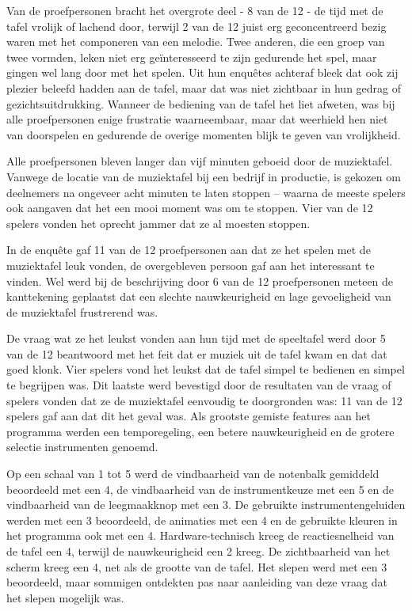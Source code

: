 \documentclass{acm}
\begin{document}
Van de proefpersonen bracht het overgrote deel - 8 van de 12 - de tijd met de tafel vrolijk of lachend door, terwijl 2 van de 12 juist erg geconcentreerd bezig waren met het componeren van een melodie. Twee anderen, die een groep van twee vormden, leken niet erg ge\"interesseerd te zijn gedurende het spel, maar gingen wel lang door met het spelen. Uit hun enquêtes achteraf bleek dat ook zij plezier beleefd hadden aan de tafel, maar dat was niet zichtbaar in hun gedrag of gezichtsuitdrukking. Wanneer de bediening van de tafel het liet afweten, was bij alle proefpersonen enige frustratie waarneembaar, maar dat weerhield hen niet van doorspelen en gedurende de overige momenten blijk te geven van vrolijkheid. 

Alle proefpersonen bleven langer dan vijf minuten geboeid door de muziektafel. Vanwege de locatie van de muziektafel bij een bedrijf in productie, is gekozen om deelnemers na ongeveer acht minuten te laten stoppen -- waarna de meeste spelers ook aangaven dat het een mooi moment was om te stoppen. Vier van de 12 spelers vonden het oprecht jammer dat ze al moesten stoppen.

In de enquête gaf 11 van de 12 proefpersonen aan dat ze het spelen met de muziektafel leuk vonden, de overgebleven persoon gaf aan het interessant te vinden. Wel werd bij de beschrijving door 6 van de 12 proefpersonen meteen de kanttekening geplaatst dat een slechte nauwkeurigheid en lage gevoeligheid van de muziektafel frustrerend was.

De vraag wat ze het leukst vonden aan hun tijd met de speeltafel werd door 5 van de 12 beantwoord met het feit dat er muziek uit de tafel kwam en dat dat goed klonk. Vier spelers vond het leukst dat de tafel simpel te bedienen en simpel te begrijpen was. Dit laatste werd bevestigd door de resultaten van de vraag of spelers vonden dat ze de muziektafel eenvoudig te doorgronden was: 11 van de 12 spelers gaf aan dat dit het geval was. Als grootste gemiste features aan het programma werden een temporegeling, een betere nauwkeurigheid en de grotere selectie instrumenten genoemd.

Op een schaal van 1 tot 5 werd de vindbaarheid van de notenbalk gemiddeld beoordeeld met een 4, de vindbaarheid van de instrumentkeuze met een 5 en de vindbaarheid van de leegmaakknop met een 3. De gebruikte instrumentengeluiden werden met een 3 beoordeeld, de animaties met een 4 en de gebruikte kleuren in het programma ook met een 4. Hardware-technisch kreeg de reactiesnelheid van de tafel een 4, terwijl de nauwkeurigheid een 2 kreeg. De zichtbaarheid van het scherm kreeg een 4, net als de grootte van de tafel. Het slepen werd met een 3 beoordeeld, maar sommigen ontdekten pas naar aanleiding van deze vraag dat het slepen mogelijk was.
\end{document}
